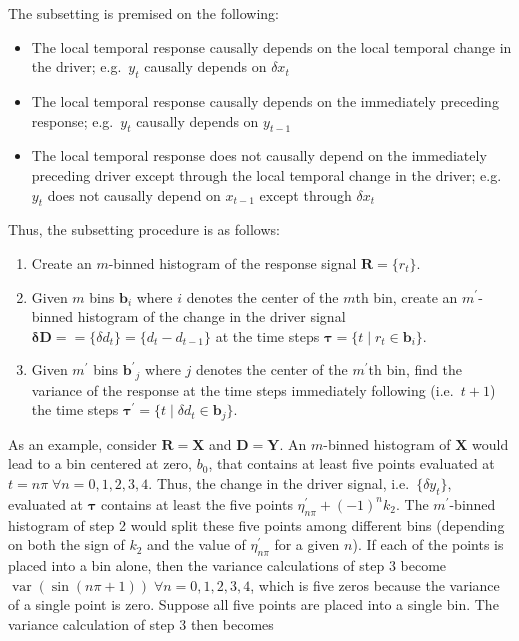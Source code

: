 \documentclass[a4paper,11pt]{article}
\begin{document}
The subsetting is premised on the following:
\begin{itemize}
\item The local temporal response causally depends on the local temporal change in the driver; e.g.\ $y_{t}$ causally depends on $\delta x_{t}$
\item The local temporal response causally depends on the immediately preceding response; e.g.\ $y_{t}$ causally depends on $y_{t-1}$
\item The local temporal response does not causally depend on the immediately preceding driver except through the local temporal change in the driver; e.g.\ $y_{t}$ does not causally depend on $x_{t-1}$ except through $\delta x_t$
\end{itemize}
Thus, the subsetting procedure is as follows:
\begin{enumerate}
\item Create an $m$-binned histogram of the response signal $\mathbf{R} = \{r_t\}$.
\item Given $m$ bins $\mathbf{b}_i$ where $i$ denotes the center of the $m$th bin, create an $m^\prime$-binned histogram of the change in the driver signal $\mathbf{\delta D} = =\{\delta d_t\} = \{d_t-d_{t-1}\}$ at the time steps $\mathbf{\tau} = \{t\;|\;r_t\in \mathbf{b}_i\}$.
\item Given $m^\prime$ bins $\mathbf{b^\prime}_j$ where $j$ denotes the center of the $m^\prime$th bin, find the variance of the response at the time steps immediately following (i.e.\ $t+1$) the time steps $\mathbf{\tau^\prime} = \{t\;|\;\delta d_t\in \mathbf{b}_j\}$.
\end{enumerate}
As an example, consider $\mathbf{R} = \mathbf{X}$ and $\mathbf{D} = \mathbf{Y}$.  An $m$-binned histogram of $\mathbf{X}$ would lead to a bin centered at zero, $b_0$, that contains at least five points evaluated at $t=n\pi\;\forall n=0,1,2,3,4$.  Thus, the change in the driver signal, i.e.\ $\{\delta y_t\}$, evaluated at $\mathbf{\tau}$ contains at least the five points $\eta^\prime_{n\pi} + \left(-1\right)^n k_2$.  The $m^\prime$-binned histogram of step 2 would split these five points among different bins (depending on both the sign of $k_2$ and the value of $\eta^\prime_{n\pi}$ for a given $n$).  If each of the points is placed into a bin alone, then the variance calculations of step 3 become $\mathop{var}\left(\sin(n\pi+1)\right)\;\forall n=0,1,2,3,4$, which is five zeros because the variance of a single point is zero.  Suppose all five points are placed into a single bin.  The variance calculation of step 3 then becomes 
\end{document}
